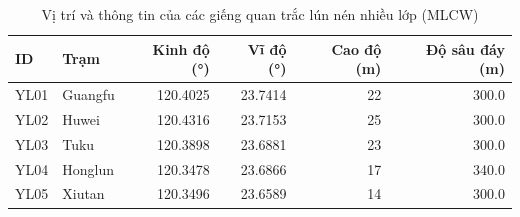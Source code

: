 \begin{table}[htbp]
	\centering
	\caption{Vị trí và thông tin của các giếng quan trắc lún nén nhiều lớp (MLCW)}
	\label{tab:mlcw_info}
	\begin{tabular}{llrrrr}
		\toprule
		\textbf{ID} & \textbf{Trạm} & \textbf{Kinh độ (\si{\degree})} & \textbf{Vĩ độ (\si{\degree})} & \textbf{Cao độ (m)} & \textbf{Độ sâu đáy (m)} \\
		\midrule
		YL01 & Guangfu  & 120.4025 & 23.7414 & 22 & 300.0 \\
		YL02 & Huwei    & 120.4316 & 23.7153 & 25 & 300.0 \\
		YL03 & Tuku     & 120.3898 & 23.6881 & 23 & 300.0 \\
		YL04 & Honglun  & 120.3478 & 23.6866 & 17 & 340.0 \\
		YL05 & Xiutan   & 120.3496 & 23.6589 & 14 & 300.0 \\
		\bottomrule
	\end{tabular}
\end{table}

